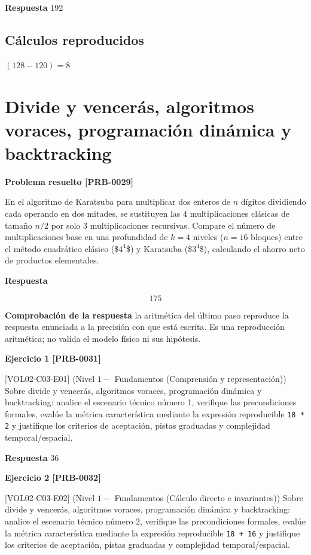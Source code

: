 \documentclass{book}
\begin{document}
\noindent\textbf{Respuesta} 192

\subsection*{Cálculos reproducidos}

\(\left(128-120\right) = 8\)

\section{Divide y vencerás, algoritmos voraces, programación dinámica y backtracking}

\noindent\textbf{Problema resuelto [PRB-0029]}

En el algoritmo de Karatsuba para multiplicar dos enteros de \(n\) dígitos dividiendo cada operando en dos mitades, se sustituyen las \(4\) multiplicaciones clásicas de tamaño \(n/2\) por solo \(3\) multiplicaciones recursivas. Compare el número de multiplicaciones base en una profundidad de \(k = 4\) niveles (\(n = 16\) bloques) entre el método cuadrático clásico (\$\(4^4\)\$) y Karatsuba (\$\(3^4\)\$), calculando el ahorro neto de productos elementales.

\noindent\textbf{Respuesta}

\[
175
\]

\noindent\textbf{Comprobación de la respuesta} la aritmética del último paso reproduce la respuesta enunciada a la precisión con que está escrita. Es una reproducción aritmética; no valida el modelo físico ni sus hipótesis.

\noindent\textbf{Ejercicio 1 [PRB-0031]}

[VOL02-C03-E01] (Nivel \(1 -\) Fundamentos (Comprensión y representación)) Sobre divide y vencerás, algoritmos voraces, programación dinámica y backtracking: analice el escenario técnico número 1, verifique las precondiciones formales, evalúe la métrica característica mediante la expresión reproducible \texttt{18 * 2} y justifique los criterios de aceptación, pistas graduadas y complejidad temporal/espacial.

\noindent\textbf{Respuesta} 36

\noindent\textbf{Ejercicio 2 [PRB-0032]}

[VOL02-C03-E02] (Nivel \(1 -\) Fundamentos (Cálculo directo e invariantes)) Sobre divide y vencerás, algoritmos voraces, programación dinámica y backtracking: analice el escenario técnico número 2, verifique las precondiciones formales, evalúe la métrica característica mediante la expresión reproducible \texttt{18 + 16} y justifique los criterios de aceptación, pistas graduadas y complejidad temporal/espacial.
\end{document}
